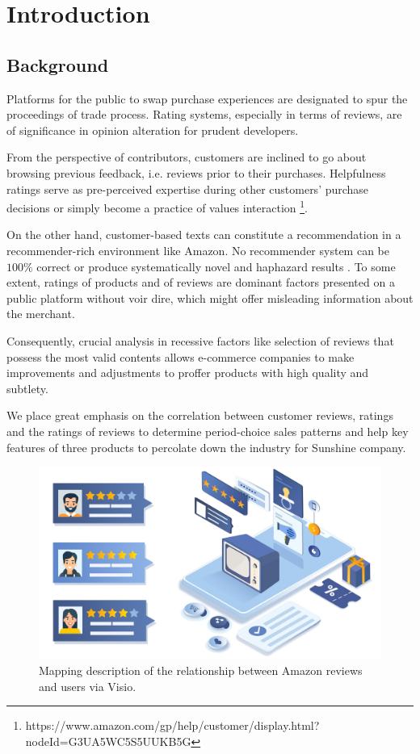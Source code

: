 \documentclass[12pt]{article}%
\begin{document}
\section{Introduction}	
\subsection{Background}
Platforms for the public to swap purchase experiences are designated to spur the proceedings of trade process. Rating systems, especially in terms of reviews, are of significance in opinion alteration for prudent developers.
	
From the perspective of contributors, customers are inclined to go about browsing previous feedback, i.e. reviews prior to their purchases. Helpfulness ratings serve as pre-perceived expertise during other customers’ purchase decisions or simply become a practice of values interaction \footnote{\quad https://www.amazon.com/gp/help/customer/display.html?nodeId=G3UA5WC5S5UUKB5G}.

On the other hand, customer-based texts can constitute a recommendation in a recommender-rich environment like Amazon. No recommender system can be $100\%$ correct or produce systematically novel and haphazard results\cite{bib:1, bib:2} . To some extent, ratings of products and of reviews are dominant factors presented on a public platform without voir dire, which might offer misleading information about the merchant.

 Consequently, crucial analysis in recessive factors like selection of reviews that possess the most valid contents allows e-commerce companies to make improvements and adjustments to proffer products with high quality and subtlety\cite{amsu}.
 
We place great emphasis on the correlation between customer reviews, ratings and the ratings of reviews to determine period-choice sales patterns and help key features of three products to percolate down the industry for Sunshine company.


\begin{figure}[H]
	\centering
	\includegraphics[width=.7\textwidth]{pic/protect.jpg}%
	\caption{Mapping description of the relationship between Amazon reviews and users via Visio.}\label{Suzanne}%
\end{figure}
\end{document}
